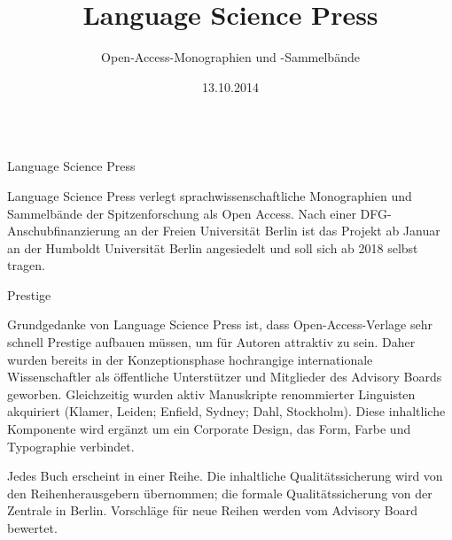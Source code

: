 \documentclass[final,utf8]{beamer}
\title{\Huge Language Science Press}
\author{Open-Access-Monographien und -Sammelb\"ande}
\institute{Sebastian Nordhoff} %
\date{13.10.2014}
\begin{document}
\begin{frame}{} 
\vspace{-1cm}
\begin{columns}[t]
  \begin{column}{.45\linewidth}  
    \begin{block}{Language Science Press} 
	\parbox{.9\textwidth}{
	Language Science Press verlegt sprachwissenschaftliche Monographien und Sammelb\"ande der Spitzenforschung als Open Access.
	Nach einer DFG-Anschubfinanzierung an der Freien Universit\"at Berlin ist das Projekt ab Januar an der Humboldt Universit\"at Berlin angesiedelt und soll sich ab 2018 selbst tragen.  
}
    \end{block}    
	
 
    \begin{block}{Prestige} 
	\parbox{.9\textwidth}{
	Grundgedanke von Language Science Press ist, dass Open-Access-Verlage sehr schnell Prestige aufbauen m\"ussen, um f\"ur Autoren attraktiv zu sein. Daher wurden bereits in der Konzeptionsphase hochrangige internationale Wissenschaftler als \"offentliche Unterst\"utzer und Mitglieder des Advisory Boards geworben. Gleichzeitig wurden aktiv Manuskripte renommierter Linguisten akquiriert (Klamer, Leiden; Enfield, Sydney; Dahl, Stockholm). Diese inhaltliche Komponente wird erg\"anzt um ein Corporate Design, das Form, Farbe und Typographie verbindet. 

	Jedes Buch erscheint in einer Reihe. Die inhaltliche Qualit\"atssicherung wird von den Reihenherausgebern \"ubernommen; die formale Qualit\"atssicherung von der Zentrale in Berlin. Vorschl\"age f\"ur neue Reihen werden vom Advisory Board bewertet.
}
    \end{block}    


\end{column}
\end{columns}
\end{frame}
\end{document}
